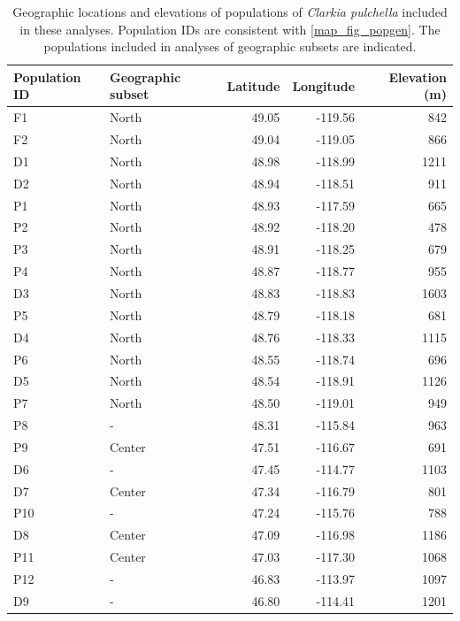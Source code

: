 \documentclass{article}
\newcommand{\beginsupplement}{%
        \setcounter{table}{0}
        \renewcommand{\thetable}{S\arabic{table}}%
        \setcounter{figure}{0}
        \renewcommand{\thefigure}{S\arabic{figure}}%
     }
\begin{document}
\clearpage


\beginsupplement

\begin{table}[ht]
\centering
\caption[Geographic information for populations included in population genetic analyses]{Geographic locations and elevations of populations of \textit{Clarkia pulchella} included in these analyses. Population IDs are consistent with \autoref{map_fig_popgen}. The populations included in analyses of geographic subsets are indicated.}
\label{pops_tab}
\begin{tabular}{llrrr}
\toprule
Population ID	& Geographic subset &	Latitude & Longitude & Elevation (m) \\
\midrule
F1  & North   &	49.05 &	-119.56 &	842  \\
F2  &	North   &	49.04 &	-119.05 &	866  \\
D1  &	North   &	48.98 &	-118.99 &	1211 \\
D2  &	North   &	48.94 &	-118.51 &	911  \\
P1  &	North   &	48.93 &	-117.59 &	665  \\
P2  &	North   &	48.92 &	-118.20 &	478  \\
P3  &	North   &	48.91 &	-118.25 &	679  \\
P4  &	North   &	48.87 &	-118.77 &	955  \\
D3  &	North   &	48.83 &	-118.83 &	1603 \\
P5  &	North   &	48.79 &	-118.18 &	681  \\
D4  &	North   &	48.76 &	-118.33 &	1115 \\
P6  &	North   &	48.55 &	-118.74 &	696  \\
D5  &	North   &	48.54 &	-118.91 &	1126 \\
P7  &	North   &	48.50 &	-119.01 &	949  \\
P8  &	-       &	48.31 &	-115.84 &	963  \\
P9  &	Center  &	47.51 &	-116.67 &	691  \\
D6  &	-	      & 47.45 &	-114.77 &	1103 \\
D7  &	Center  &	47.34 &	-116.79 &	801  \\
P10 &	-	      & 47.24 &	-115.76 &	788  \\
D8  &	Center	& 47.09 &	-116.98 &	1186 \\
P11 &	Center	& 47.03 &	-117.30 &	1068 \\
P12 &	-       &	46.83 &	-113.97 &	1097 \\
D9  &	-       &	46.80 &	-114.41 &	1201 \\

\end{tabular}
\end{table}
\end{document}
